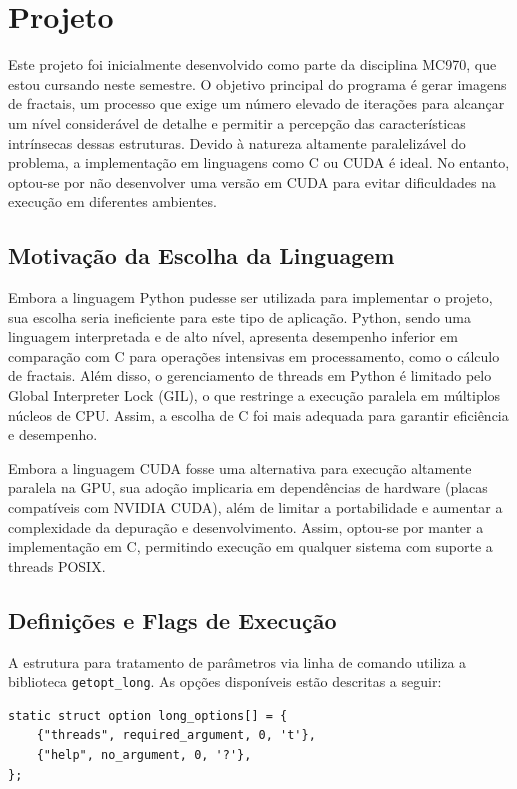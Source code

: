 \section{Projeto}

Este projeto foi inicialmente desenvolvido como parte da disciplina MC970, que estou cursando neste semestre. O objetivo principal do programa é gerar imagens de fractais, um processo que exige um número elevado de iterações para alcançar um nível considerável de detalhe e permitir a percepção das características intrínsecas dessas estruturas. Devido à natureza altamente paralelizável do problema, a implementação em linguagens como C ou CUDA é ideal. No entanto, optou-se por não desenvolver uma versão em CUDA para evitar dificuldades na execução em diferentes ambientes.

\subsection{Motivação da Escolha da Linguagem}

Embora a linguagem Python pudesse ser utilizada para implementar o projeto, sua escolha seria ineficiente para este tipo de aplicação. Python, sendo uma linguagem interpretada e de alto nível, apresenta desempenho inferior em comparação com C para operações intensivas em processamento, como o cálculo de fractais. Além disso, o gerenciamento de threads em Python é limitado pelo Global Interpreter Lock (GIL), o que restringe a execução paralela em múltiplos núcleos de CPU. Assim, a escolha de C foi mais adequada para garantir eficiência e desempenho.

Embora a linguagem CUDA fosse uma alternativa para execução altamente paralela na GPU, sua adoção implicaria em dependências de hardware (placas compatíveis com NVIDIA CUDA), além de limitar a portabilidade e aumentar a complexidade da depuração e desenvolvimento. Assim, optou-se por manter a implementação em C, permitindo execução em qualquer sistema com suporte a threads POSIX.

\subsection{Definições e Flags de Execução}

A estrutura para tratamento de parâmetros via linha de comando utiliza a biblioteca \texttt{getopt\_long}. As opções disponíveis estão descritas a seguir:


\begin{lstlisting}[caption=Flags de linha de comando]
static struct option long_options[] = {
    {"threads", required_argument, 0, 't'},
    {"help", no_argument, 0, '?'},
};
\end{lstlisting}


